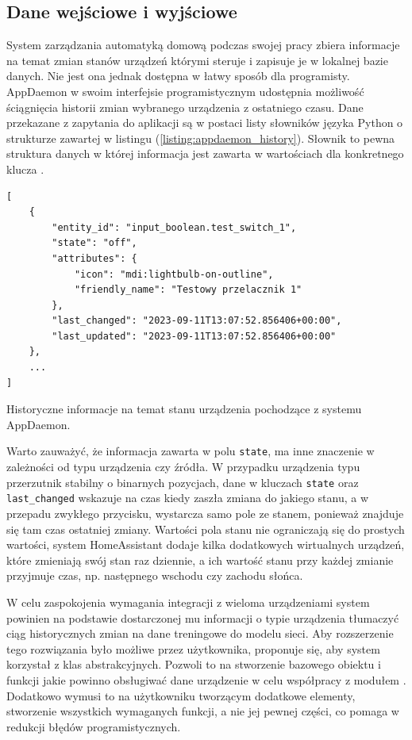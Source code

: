 \subsection{Dane wejściowe i wyjściowe}
System zarządzania automatyką domową podczas swojej pracy zbiera informacje na temat zmian stanów urządzeń którymi steruje i zapisuje je w lokalnej bazie danych. Nie jest ona jednak dostępna w łatwy sposób dla programisty. AppDaemon w swoim interfejsie programistycznym udostępnia możliwość ściągnięcia historii zmian wybranego urządzenia z ostatniego czasu. Dane przekazane z zapytania do aplikacji są w postaci listy słowników języka Python o strukturze zawartej w listingu (\ref{listing:appdaemon_history}). Słownik to pewna struktura danych w której informacja jest zawarta w wartościach dla konkretnego klucza \cite{book:learning_python}.

\begin{listing}
\begin{verbatim}
[
    {
        "entity_id": "input_boolean.test_switch_1",
        "state": "off",
        "attributes": {
            "icon": "mdi:lightbulb-on-outline",
            "friendly_name": "Testowy przelacznik 1"
        },
        "last_changed": "2023-09-11T13:07:52.856406+00:00",
        "last_updated": "2023-09-11T13:07:52.856406+00:00"
    },
    ...
]
\end{verbatim}
\caption{Historyczne informacje na temat stanu urządzenia pochodzące z systemu AppDaemon.} \label{listing:appdaemon_history}
\end{listing}

Warto zauważyć, że informacja zawarta w polu \verb+state+, ma inne znaczenie w zależności od typu urządzenia czy źródła. W przypadku urządzenia typu przerzutnik stabilny o binarnych pozycjach, dane w kluczach \verb+state+ oraz \verb+last_changed+ wskazuje na czas kiedy zaszła zmiana do jakiego stanu, a w przepadu zwykłego przycisku, wystarcza samo pole ze stanem, ponieważ znajduje się tam czas ostatniej zmiany. Wartości pola stanu nie ograniczają się do prostych wartości, system HomeAssistant dodaje kilka dodatkowych wirtualnych urządzeń, które zmieniają swój stan raz dziennie, a ich wartość stanu przy każdej zmianie przyjmuje czas, np. następnego wschodu czy zachodu słońca.

W celu zaspokojenia wymagania integracji z wieloma urządzeniami system powinien na podstawie dostarczonej mu informacji o typie urządzenia tłumaczyć ciąg historycznych zmian na dane treningowe do modelu sieci. Aby rozszerzenie tego rozwiązania było możliwe przez użytkownika, proponuje się, aby system korzystał z klas abstrakcyjnych. Pozwoli to na stworzenie bazowego obiektu i funkcji jakie powinno obsługiwać dane urządzenie w celu współpracy z modułem \cite{book:czysty_kod}. Dodatkowo wymusi to na użytkowniku tworzącym dodatkowe elementy, stworzenie wszystkich wymaganych funkcji, a nie jej pewnej części, co pomaga w redukcji błędów programistycznych.

